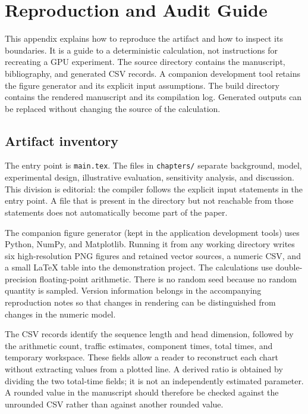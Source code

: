 \section{Reproduction and Audit Guide}
\label{sec:appendix}
This appendix explains how to reproduce the artifact and how to inspect its boundaries. It is a guide to a deterministic calculation, not instructions for recreating a GPU experiment. The source directory contains the manuscript, bibliography, and generated CSV records. A companion development tool retains the figure generator and its explicit input assumptions. The build directory contains the rendered manuscript and its compilation log. Generated outputs can be replaced without changing the source of the calculation.

\subsection{Artifact inventory}
The entry point is \texttt{main.tex}. The files in \texttt{chapters/} separate background, model, experimental design, illustrative evaluation, sensitivity analysis, and discussion. This division is editorial: the compiler follows the explicit input statements in the entry point. A file that is present in the directory but not reachable from those statements does not automatically become part of the paper.

The companion figure generator (kept in the application development tools) uses Python, NumPy, and Matplotlib. Running it from any working directory writes six high-resolution PNG figures and retained vector sources, a numeric CSV, and a small LaTeX table into the demonstration project. The calculations use double-precision floating-point arithmetic. There is no random seed because no random quantity is sampled. Version information belongs in the accompanying reproduction notes so that changes in rendering can be distinguished from changes in the numeric model.

The CSV records identify the sequence length and head dimension, followed by the arithmetic count, traffic estimates, component times, total times, and temporary workspace. These fields allow a reader to reconstruct each chart without extracting values from a plotted line. A derived ratio is obtained by dividing the two total-time fields; it is not an independently estimated parameter. A rounded value in the manuscript should therefore be checked against the unrounded CSV rather than against another rounded value.

